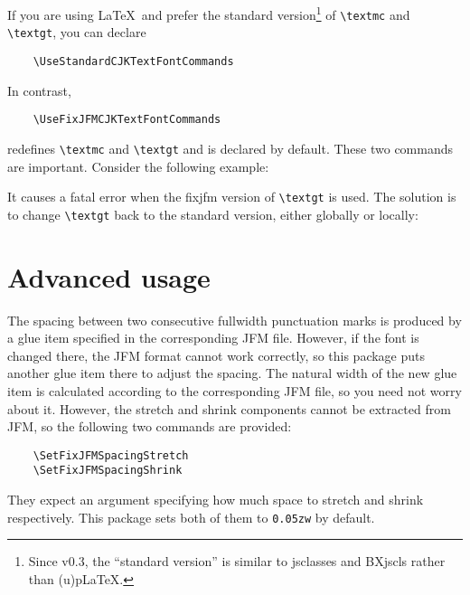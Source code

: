 \documentclass[a4paper]{article}
\newcommand\NormalSans{\normalfont\sffamily}
\newcommand\pkg[1]{{\protect\NormalSans#1}}
\newcommand\pLaTeX{p\LaTeX}
\newcommand\FwBox{\ensuremath{\square}\hskip0em plus 0.05em\relax}
\newcommand\TwoFwBoxes{\FwBox\FwBox}
\begin{document}
If you are using \LaTeX\ and prefer the standard version\footnote{Since v0.3,
the ``standard version'' is similar to \pkg{jsclasses} and \pkg{BXjscls} rather
than (u)\pLaTeX.} of \verb|\textmc| and \verb|\textgt|, you can declare
\begin{verbatim}
    \UseStandardCJKTextFontCommands
\end{verbatim}
In contrast,
\begin{verbatim}
    \UseFixJFMCJKTextFontCommands
\end{verbatim}
redefines \verb|\textmc| and \verb|\textgt| and is declared by default. These
two commands are important. Consider the following example:
\begin{trivlist}
\item\relax{\ttfamily\hskip2em}\verb|\textgt{\Large |\TwoFwBoxes\verb|}|
\end{trivlist}
It causes a fatal error when the \pkg{fixjfm} version of \verb|\textgt| is used.
The solution is to change \verb|\textgt| back to the standard version, either
globally or locally:
\begin{trivlist}\itemsep=0pt\relax\parsep=0pt\relax
\item\relax{\ttfamily\hskip2em}%
\verb|\UseFixJFMCJKTextFontCommands   \textgt{|\TwoFwBoxes\verb|}|
\item\relax{\ttfamily\hskip2em}%
\verb|\UseStandardCJKTextFontCommands \textgt{\Large |\TwoFwBoxes\verb|}|
\item\relax{\ttfamily\hskip2em}%
\verb|\UseFixJFMCJKTextFontCommands   \textgt{|\TwoFwBoxes\verb|}|
\item\relax{\ttfamily\hskip1.5em}%
\verb|{\UseStandardCJKTextFontCommands \textgt{\Large |\TwoFwBoxes\verb|}}|
\end{trivlist}

\section{Advanced usage}

The spacing between two consecutive fullwidth punctuation marks is produced by
a glue item specified in the corresponding JFM file. However, if the font is
changed there, the JFM format cannot work correctly, so this package puts
another glue item there to adjust the spacing. The natural width of the new glue
item is calculated according to the corresponding JFM file, so you need not
worry about it. However, the stretch and shrink components cannot be extracted
from JFM, so the following two commands are provided:
\begin{verbatim}
    \SetFixJFMSpacingStretch
    \SetFixJFMSpacingShrink
\end{verbatim}
They expect an argument specifying how much space to stretch and shrink
respectively. This package sets both of them to \verb|0.05zw| by default.
\end{document}
